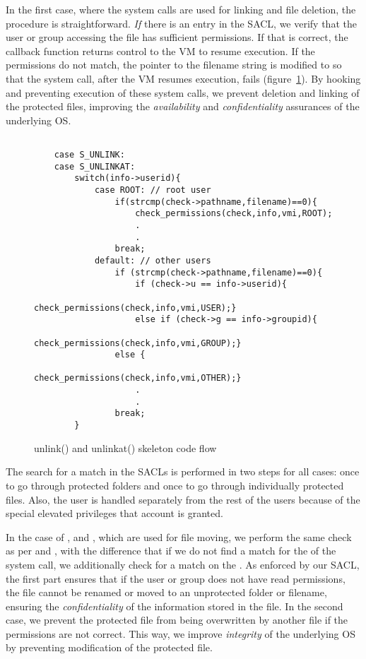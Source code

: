 \par In the first case, where the system calls are used for linking and file deletion, the procedure is straightforward. \emph{If} there is an entry in the \ac{SACL}, we verify that the user or group accessing the file has sufficient permissions. If that is correct, the callback function returns control to the \ac{VM} to resume execution. If the permissions do not match, the pointer to the filename string is modified to  so that the system call, after the \ac{VM} resumes execution, fails (figure~\ref{fig:unlink}). By hooking and preventing execution of these system calls, we prevent deletion and linking of the protected files, improving the \emph{availability} and \emph{confidentiality} assurances of the underlying \ac{OS}.

\begin{figure}[ht]
\selectfont
\begin{lstlisting}[style=CStyle]

	case S_UNLINK:
	case S_UNLINKAT:
		switch(info->userid){
			case ROOT: // root user
				if(strcmp(check->pathname,filename)==0){
					check_permissions(check,info,vmi,ROOT);			
					.
					.
				break;
			default: // other users
				if (strcmp(check->pathname,filename)==0){
					if (check->u == info->userid){
						check_permissions(check,info,vmi,USER);}
					else if (check->g == info->groupid){
						check_permissions(check,info,vmi,GROUP);}
				else {
					check_permissions(check,info,vmi,OTHER);}
					.
					.
				break;
		}
\end{lstlisting}
	\caption{unlink() and unlinkat() skeleton code flow}
	\label{fig:unlink}
\end{figure}

\par The search for a match in the \ac{SACL}s is performed in two steps for all cases: once to go through protected folders and once to go through individually protected files. Also, the  user is handled separately from the rest of the users because of the special elevated privileges that account is granted. 

\par In the case of ,  and , which are used for file moving, we perform the same check as per  and , with the difference that if we do not find a match for the  of the system call, we additionally check for a match on the . As enforced by our \ac{SACL}, the first part ensures that if the user or group does not have read permissions, the file cannot be renamed or moved to an unprotected folder or filename, ensuring the \emph{confidentiality} of the information stored in the file. In the second case, we prevent the protected file from being overwritten by another file if the permissions are not correct. This way, we improve \emph{integrity} of the underlying \ac{OS} by preventing modification of the protected file. 

